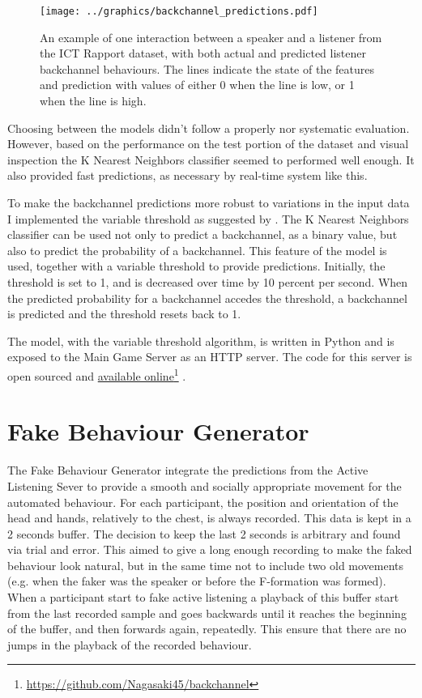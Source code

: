 \documentclass[]{simple-thesis}
\newcommand\fnurl[2]{%
  \href{#2}{#1}\footnote{\url{#2}}%
}
\begin{document}
\begin{figure}
  \texttt{[image: ../graphics/backchannel\_predictions.pdf]}
  \caption{An example of one interaction between a speaker and a listener from the ICT Rapport dataset, with both actual and predicted listener backchannel behaviours. The lines indicate the state of the features and prediction with values of either 0 when the line is low, or 1 when the line is high.}
  \label{fig:system:backchannel_predictions}
\end{figure}

Choosing between the models didn't follow a properly nor systematic evaluation.
However, based on the performance on the test portion of the dataset and visual inspection the K Nearest Neighbors classifier seemed to performed well enough.
It also provided fast predictions, as necessary by real-time system like this.

To make the backchannel predictions more robust to variations in the input data I implemented the variable threshold as suggested by \cite{Kok2012}.
The K Nearest Neighbors classifier can be used not only to predict a backchannel, as a binary value, but also to predict the probability of a backchannel.
This feature of the model is used, together with a variable threshold to provide predictions.
Initially, the threshold is set to 1, and is decreased over time by 10 percent per second.
When the predicted probability for a backchannel accedes the threshold, a backchannel is predicted and the threshold resets back to 1.

The model, with the variable threshold algorithm, is written in Python and is exposed to the Main Game Server as an HTTP server.
The code for this server is open sourced and \fnurl{available online}{https://github.com/Nagasaki45/backchannel}.

\section{Fake Behaviour Generator}\label{system:fake_behaviour_generator}

The Fake Behaviour Generator integrate the predictions from the Active Listening Sever to provide a smooth and socially appropriate movement for the automated behaviour.
For each participant, the position and orientation of the head and hands, relatively to the chest, is always recorded.
This data is kept in a 2 seconds buffer.
The decision to keep the last 2 seconds is arbitrary and found via trial and error.
This aimed to give a long enough recording to make the faked behaviour look natural, but in the same time not to include two old movements (e.g. when the faker was the speaker or before the F-formation was formed).
When a participant start to fake active listening a playback of this buffer start from the last recorded sample and goes backwards until it reaches the beginning of the buffer, and then forwards again, repeatedly.
This ensure that there are no jumps in the playback of the recorded behaviour.
\end{document}
